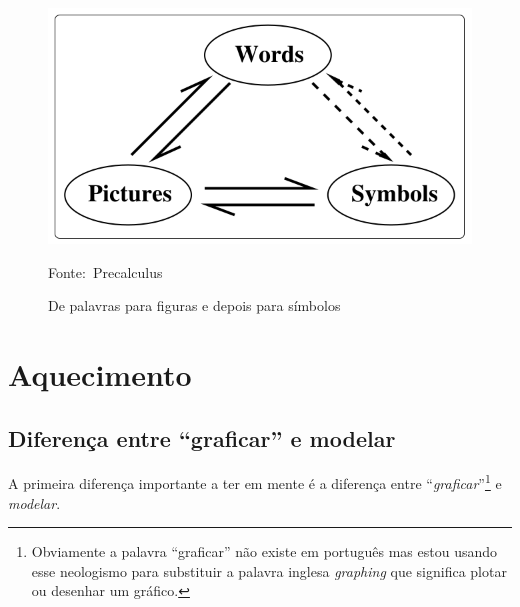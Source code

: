 \documentclass[pdftex, brazil, 12pt, twoside]{article}
\begin{document}
\begin{figure}[ht]
  \begin{center}
    \caption{De palavras para figuras e depois para símbolos}
    \label{fig:palavras-imagens-simbolos}
    \includegraphics[scale=0.5]{imagens/palavras-imagens-simbolos.png}
    
    \footnotesize{Fonte:~Precalculus}
  \end{center}
\end{figure}


\section{Aquecimento}
\label{aquecimento}

\subsection{Diferença entre ``graficar'' e modelar}
\label{aquecimento-graficar-modelar}

A primeira diferença importante a ter em mente é a diferença entre ``\emph{graficar}''\footnote{Obviamente
  a palavra ``graficar'' não existe em português mas estou usando esse neologismo para substituir
  a palavra inglesa \emph{graphing} que significa plotar ou desenhar um gráfico.} e \emph{modelar}.
\end{document}
